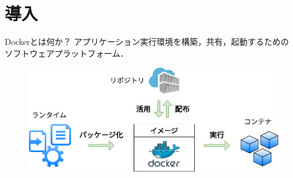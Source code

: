 \section{導入}

\begin{frame}{Dockerとは何か？}
    アプリケーション実行環境を構築，共有，起動するための\\ソフトウェアプラットフォーム．

    \begin{figure}
        \centering
        \includegraphics[width=\linewidth]{img/intro1.pdf}
    \end{figure}
\end{frame}


